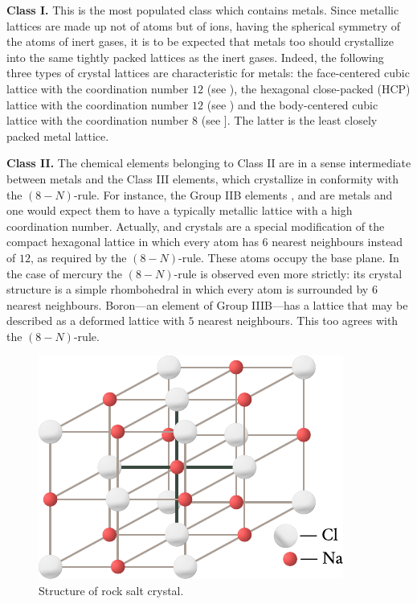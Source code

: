 \textbf{Class I.} This is the most populated class which contains metals. Since metallic lattices are made up not of atoms but of ions, having the spherical symmetry of the atoms of inert gases, it is to be expected that metals too should crystallize into the same tightly packed lattices as the inert gases. Indeed, the following three types of crystal lattices are characteristic for metals: the face-centered cubic lattice with the coordination number $12$ (see ), the hexagonal
close-packed (HCP) lattice with the coordination number $12$ (see
) and the body-centered cubic lattice with the coordination number $8$ (see ]. The latter is the least closely packed metal lattice.

\textbf{Class II.} The chemical elements belonging to Class II are in a sense intermediate between metals and the Class III elements, which crystallize in conformity with the $(8-N)$-rule. For instance, the Group IIB elements ,  and  are metals and one would expect them to have a typically metallic lattice with a high coordination number. Actually,  and  crystals are a special modification of the compact hexagonal lattice in which every atom has $6$ nearest neighbours instead of $12$, as required by the $(8-N)$-rule. These atoms occupy the base plane. In the case of mercury the $(8-N)$-rule is observed even more strictly: its crystal structure is a simple rhombohedral in which every atom is surrounded by $6$ nearest neighbours. Boron---an element of Group IIIB---has a lattice that may be described as a deformed lattice with $5$ nearest neighbours. This too agrees with the $(8-N)$-rule.

\begin{figure}[t]
	\begin{center}
		\includegraphics[scale=0.95]{figures/ch_01/fig_1_21.pdf}
		\caption[]{Structure of rock salt  crystal.}
		\label{fig:1_21}
	\end{center}
	\vspace{-0.75cm}
\end{figure}

